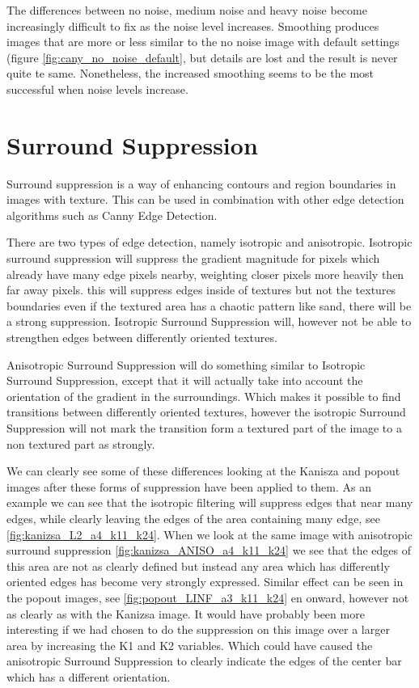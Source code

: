 \documentclass[10pt,a4paper]{article}
\begin{document}
The differences between no noise, medium noise and heavy noise become increasingly difficult to fix as the noise level increases. Smoothing produces images that are more or less similar to the no noise image with default settings (figure \ref{fig:cany_no_noise_default}, but details are lost and the result is never quite te same. Nonetheless, the increased smoothing seems to be the most successful when noise levels increase. 

\section{Surround Suppression}
Surround suppression is a way of enhancing contours and region boundaries in images with texture. This can be used in combination with other edge detection algorithms such as Canny Edge Detection. 

There are two types of edge detection, namely isotropic and anisotropic. Isotropic surround suppression will suppress the gradient magnitude for pixels which already have many edge pixels nearby, weighting closer pixels more heavily then far away pixels. this will suppress edges inside of textures but not the textures boundaries even if the textured area has a chaotic pattern like sand, there will be a strong suppression. Isotropic Surround Suppression will, however not be able to strengthen edges between differently oriented textures.

Anisotropic Surround Suppression will do something similar to Isotropic Surround Suppression, except that it will actually take into account the orientation of the gradient in the surroundings. Which makes it possible to find transitions between differently oriented textures, however the isotropic Surround Suppression will not mark the transition form a textured part of the image to a non textured part as strongly.

We can clearly see some of these differences looking at the Kanisza and popout images after these forms of suppression have been applied to them. As an example we can see that the isotropic filtering will suppress edges that near many edges, while clearly leaving the edges of the area containing many edge, see \ref{fig:kanizsa_L2_a4_k11_k24}. When we look at the same image with anisotropic surround suppression \ref{fig:kanizsa_ANISO_a4_k11_k24} we see that the edges of this area are not as clearly defined but instead any area which has differently oriented edges has become very strongly expressed. Similar effect can be seen in the popout images, see \ref{fig:popout_LINF_a3_k11_k24} en onward, however not as clearly as with the Kanizsa image. It would have probably been more interesting if we had chosen to do the suppression on this image over a larger area by increasing the K1 and K2 variables. Which could have caused the anisotropic Surround Suppression to clearly indicate the edges of the center bar which has a different orientation.
\end{document}
